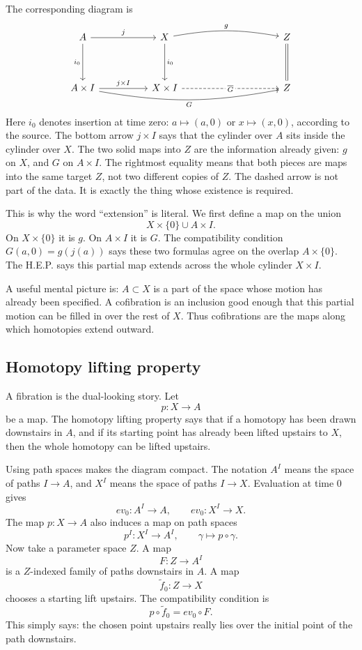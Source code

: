 The corresponding diagram is
\[
\begin{tikzcd}[column sep=5.0em,row sep=3.8em]
A \arrow[r,"j"] \arrow[d,"i_0"']
  & X \arrow[d,"i_0"] \arrow[rr,"g",bend left=10]
  & & Z \arrow[d,equal] \\
A\times I \arrow[r,"j\times I"] \arrow[rrr,"G"',bend right=10]
  & X\times I \arrow[rr,dashed,"\overline G" description]
  & & Z
\end{tikzcd}
\]
Here \(i_0\) denotes insertion at time zero: \(a\mapsto(a,0)\) or \(x\mapsto(x,0)\), according to the source.  The bottom arrow \(j\times I\) says that the cylinder over \(A\) sits inside the cylinder over \(X\).  The two solid maps into \(Z\) are the information already given: \(g\) on \(X\), and \(G\) on \(A\times I\).  The rightmost equality means that both pieces are maps into the same target \(Z\), not two different copies of \(Z\).  The dashed arrow is not part of the data.  It is exactly the thing whose existence is required.

This is why the word ``extension'' is literal.  We first define a map on the union
\[
  X\times\{0\}\cup A\times I.
\]
On \(X\times\{0\}\) it is \(g\).  On \(A\times I\) it is \(G\).  The compatibility condition \(G(a,0)=g(j(a))\) says these two formulas agree on the overlap \(A\times\{0\}\).  The H.E.P. says this partial map extends across the whole cylinder \(X\times I\).

A useful mental picture is: \(A\subset X\) is a part of the space whose motion has already been specified.  A cofibration is an inclusion good enough that this partial motion can be filled in over the rest of \(X\).  Thus cofibrations are the maps along which homotopies extend outward.

\subsection{Homotopy lifting property}

A fibration is the dual-looking story.  Let
\[
  p:X\to A
\]
be a map.  The homotopy lifting property says that if a homotopy has been drawn downstairs in \(A\), and if its starting point has already been lifted upstairs to \(X\), then the whole homotopy can be lifted upstairs.

Using path spaces makes the diagram compact.  The notation \(A^I\) means the space of paths \(I\to A\), and \(X^I\) means the space of paths \(I\to X\).  Evaluation at time \(0\) gives
\[
  ev_0:A^I\to A,
  \qquad
  ev_0:X^I\to X.
\]
The map \(p:X\to A\) also induces a map on path spaces
\[
  p^I:X^I\to A^I,\qquad \gamma\mapsto p\circ\gamma.
\]
Now take a parameter space \(Z\).  A map
\[
  F:Z\to A^I
\]
is a \(Z\)-indexed family of paths downstairs in \(A\).  A map
\[
  \widetilde f_0:Z\to X
\]
chooses a starting lift upstairs.  The compatibility condition is
\[
  p\circ \widetilde f_0=ev_0\circ F.
\]
This simply says: the chosen point upstairs really lies over the initial point of the path downstairs.

